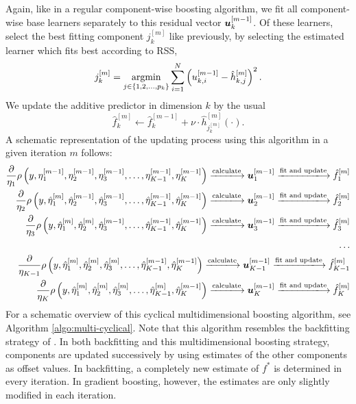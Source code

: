 Again, like in a regular component-wise boosting algorithm, we fit all component-wise base learners separately to this residual vector $\bm{u}_k^{[m-1]}$.
Of these learners, select the best fitting component $j_k^{[m]}$ like previously, by selecting the estimated learner which fits best according to RSS,
\begin{equation*}
    j_k^{[m]}=\operatorname*{argmin}_{j\in\{1,2,\ldots,p_k\}}\sum_{i=1}^N \left(u_{k,i}^{[m-1]}-\hat{h}_{k,j}^{[m]}\right)^2.
\end{equation*}
We update the additive predictor in dimension $k$ by the usual
\begin{equation*}
    \hat{f}_k^{[m]}\gets\hat{f}_k^{[m-1]}+\nu\cdot \hat{h}^{[m]}_{j_k^{[m]}}(\cdot).
\end{equation*}
A schematic representation of the updating process using this algorithm in a given iteration $m$ follows:
\begin{align*}
    \frac{\partial}{\eta_1}\rho\left(y,\eta_1^{[m-1]},\eta_2^{[m-1]},\eta_3^{[m-1]},\ldots,\eta_{K-1}^{[m-1]},\eta_K^{[m-1]}\right)
    \xlongrightarrow{\text{calculate}}\u_{1}^{[m-1]}
    \xlongrightarrow{\text{fit and update}}\hat{f}_{1}^{[m]} \\
    \frac{\partial}{\eta_2}\rho\left(y,\hat{\eta}_1^{[m]},\hat{\eta}_2^{[m-1]},\hat{\eta}_3^{[m-1]},\ldots,\hat{\eta}_{K-1}^{[m-1]},\hat{\eta}_K^{[m-1]}\right)
    \xlongrightarrow{\text{calculate}} \u_{2}^{[m-1]}
    \xlongrightarrow{\text{fit and update}}\hat{f}_{2}^{[m]} \\
    \frac{\partial}{\eta_3}\rho\left(y,\hat{\eta}_1^{[m]},\hat{\eta}_2^{[m]},\hat{\eta}_3^{[m-1]},\ldots,\hat{\eta}_{K-1}^{[m-1]},\hat{\eta}_K^{[m-1]}\right)
    \xlongrightarrow{\text{calculate}}\u_{3}^{[m-1]}
    \xlongrightarrow{\text{fit and update}}\hat{f}_{3}^{[m]} \\
    \ldots\\
    \frac{\partial}{\eta_{K-1}}\rho\left(y,\hat{\eta}_1^{[m]},\hat{\eta}_2^{[m]},\hat{\eta}_3^{[m]},\ldots,\hat{\eta}_{K-1}^{[m-1]},\hat{\eta}_K^{[m-1]}\right)
    \xlongrightarrow{\text{calculate}}\u_{K-1}^{[m-1]}
    \xlongrightarrow{\text{fit and update}}\hat{f}_{K-1}^{[m]} \\
    \frac{\partial}{\eta_K}\rho\left(y,\hat{\eta}_1^{[m]},\hat{\eta}_2^{[m]},\hat{\eta}_3^{[m]},\ldots,\hat{\eta}_{K-1}^{[m]},\hat{\eta}_K^{[m-1]}\right)
    \xlongrightarrow{\text{calculate}}\u_{K}^{[m-1]}
    \xlongrightarrow{\text{fit and update}}\hat{f}_{K}^{[m]}
\end{align*}
For a schematic overview of this cyclical multidimensional boosting algorithm, see Algorithm \ref{algo:multi-cyclical}.
Note that this algorithm resembles the backfitting strategy of \citet{hastie1986}.
In both backfitting and this multidimensional boosting strategy, components are updated successively by using estimates of the other components as offset values.
In backfitting, a completely new estimate of $f^*$ is determined in every iteration.
In gradient boosting, however, the estimates are only slightly modified in each iteration.

